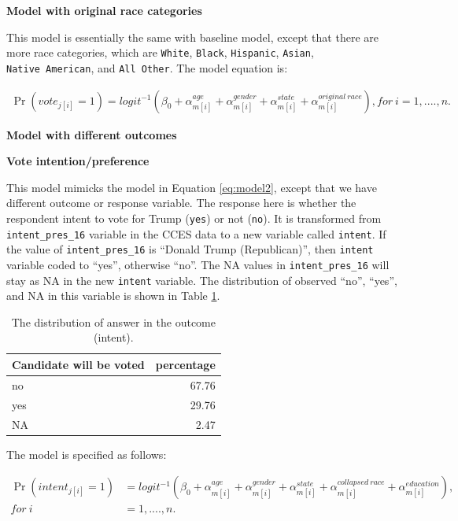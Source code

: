 \documentclass{monashthesis}
\begin{document}
\vspace{\baselineskip}

\textbf{Model with original race categories}

This model is essentially the same with baseline model, except that there are more race categories, which are \texttt{White}, \texttt{Black}, \texttt{Hispanic}, \texttt{Asian}, \texttt{Native\ American}, and \texttt{All\ Other}. The model equation is:

\begin{equation} 
\begin{split}
\Pr(vote_{j[i]} = 1) = logit^{-1}\left(\beta_0 + \alpha^{age}_{m[i]} + \alpha^{gender}_{m[i]} + \alpha^{state}_{m[i]} + \alpha^{original\ race}_{m[i]}\right), for\ i = 1, ...., n.
\end{split}
\label{eq:model3}
\end{equation}

\textbf{Model with different outcomes}

\textbf{Vote intention/preference}

This model mimicks the model in Equation \eqref{eq:model2}, except that we have different outcome or response variable. The response here is whether the respondent intent to vote for Trump (\texttt{yes}) or not (\texttt{no}). It is transformed from \texttt{intent\_pres\_16} variable in the CCES data to a new variable called \texttt{intent}. If the value of \texttt{intent\_pres\_16} is ``Donald Trump (Republican)'', then \texttt{intent} variable coded to ``yes'', otherwise ``no''. The NA values in \texttt{intent\_pres\_16} will stay as NA in the new \texttt{intent} variable. The distribution of observed ``no'', ``yes'', and NA in this variable is shown in Table \ref{tab:intent-dist}.

\begin{table}

\caption{\label{tab:intent-dist}The distribution of answer in the outcome (intent).}
\centering
\begin{tabular}[t]{lr}
\toprule
Candidate will be voted & percentage\\
\midrule
no & 67.76\\
yes & 29.76\\
NA & 2.47\\
\bottomrule
\end{tabular}
\end{table}

The model is specified as follows:

\begin{equation} 
\begin{split}
\Pr(intent_{j[i]} = 1) &= logit^{-1}\left(\beta_0 + \alpha^{age}_{m[i]} + \alpha^{gender}_{m[i]} + \alpha^{state}_{m[i]} + \alpha^{collapsed\ race}_{m[i]} + \alpha^{education}_{m[i]}\right), \\
for\ i &= 1, ...., n.
\end{split}
\label{eq:model4a}
\end{equation}
\end{document}
